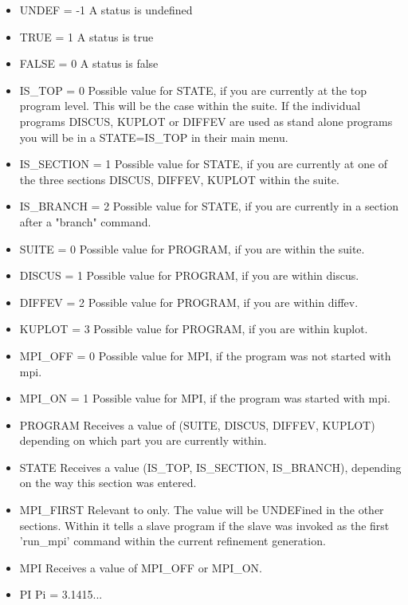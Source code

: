 \begin{itemize}
  \item UNDEF = -1  A status is undefined
  \item TRUE  = 1   A status is true
  \item FALSE = 0   A status is false
  \item IS\_TOP = 0 Possible value for STATE, if you are currently at the
                    top program level. This will be the case within the
                    suite. If the individual programs DISCUS, KUPLOT
                    or DIFFEV are used as stand alone programs you will 
                    be in a STATE=IS\_TOP in their main menu.
  \item IS\_SECTION = 1  Possible value for STATE, if you are currently at
                    one of the three sections DISCUS, DIFFEV, KUPLOT
                    within the suite.
  \item IS\_BRANCH = 2  Possible value for STATE, if you are currently in
                    a section after a "branch" command. 
  \item SUITE = 0   Possible value for PROGRAM, if you are within the suite.
  \item DISCUS = 1   Possible value for PROGRAM, if you are within discus.
  \item DIFFEV = 2   Possible value for PROGRAM, if you are within diffev.
  \item KUPLOT = 3   Possible value for PROGRAM, if you are within kuplot.
  \item MPI\_OFF = 0 Possible value for MPI, if the program was not started
                     with mpi.
  \item MPI\_ON  = 1 Possible value for MPI, if the program was started
                     with mpi.
  \item PROGRAM      Receives a value of (SUITE, DISCUS, DIFFEV, KUPLOT)
                     depending on which part you are currently within.
  \item STATE        Receives a value (IS\_TOP, IS\_SECTION, IS\_BRANCH),
                     depending on the way this section was entered.
  \item MPI\_FIRST   Relevant to \Diffev only. The value will be UNDEFined
                     in the other sections. Within \Diffev it tells a 
                     slave program if the slave was invoked as the first
                     'run\_mpi' command within the current refinement generation.
  \item MPI          Receives a value of MPI\_OFF or MPI\_ON. 
  \item PI           Pi = 3.1415... 
\end{itemize}  

